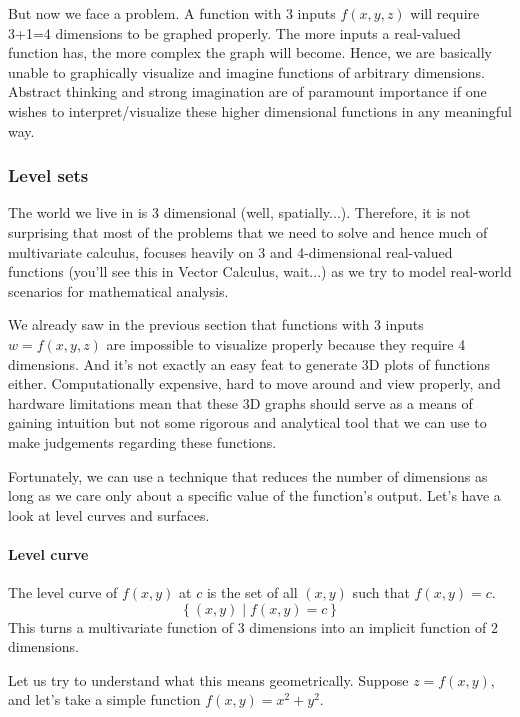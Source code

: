\documentclass[14pt]{article}
\begin{document}
	But now we face a problem. A function with 3 inputs $f(x, y, z)$ will require 3+1=4 dimensions to be graphed properly. The more inputs a real-valued function has, the more complex the graph will become. Hence, we are basically unable to graphically visualize and imagine functions of arbitrary dimensions. Abstract thinking and strong imagination are of paramount importance if one wishes to interpret/visualize these higher dimensional functions in any meaningful way. 
	
	\subsubsection{Level sets}
	The world we live in is 3 dimensional {\footnotesize(well, spatially...)}. Therefore, it is not surprising that most of the problems that we need to solve and hence much of multivariate calculus, focuses heavily on 3 and 4-dimensional real-valued functions {\footnotesize (you'll see this in Vector Calculus, wait...)} as we try to model real-world scenarios for mathematical analysis. 
	
	We already saw in the previous section that functions with 3 inputs $w = f(x, y, z)$ are impossible to visualize properly because they require 4 dimensions. And it's not exactly an easy feat to generate 3D plots of functions either. Computationally expensive, hard to move around and view properly, and hardware limitations mean that these 3D graphs should serve as a means of gaining intuition but not some rigorous and analytical tool that we can use to make judgements regarding these functions.
	
	Fortunately, we can use a technique that reduces the number of dimensions as long as we care only about a specific value of the function's output. Let's have a look at level curves and surfaces.
	
	\paragraph{Level curve} The level curve of $f(x, y)$ at $c$ is the set of all $(x, y)$ such that $f(x, y) = c$.
	\begin{equation*}
		\left\{ (x, y) \mid f(x, y) = c \right\} 
	\end{equation*}
	This turns a multivariate function of 3 dimensions into an implicit function of 2 dimensions. 
	
	Let us try to understand what this means geometrically. Suppose $z=f(x, y)$, and let's take a simple function $f(x, y) = x^2 + y^2$. 
	
\end{document}
